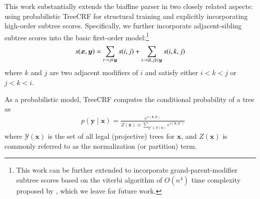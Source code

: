 
This work substantially extends the biaffine parser in two closely related aspects:
using probabilistic TreeCRF for structural training and explicitly incorporating high-order subtree scores.
Specifically, we further incorporate adjacent-sibling subtree scores into the basic first-order model:\footnote{
    This work can be further extended to incorporate
    grand-parent-modifier subtree scores
    based on the viterbi algorithm of $O(n^4)$ time complexity proposed by \citet{koo-collins-2010-efficient}, which
    we leave for future work.
}
\begin{equation}\label{eq:score-definition-2o}
    s(\boldsymbol{x}, \boldsymbol{y}) = \sum_{i\rightarrow j \in \boldsymbol{y}}s(i,j) + \sum_{
        i\rightarrow \{k,j\} \in \boldsymbol{y} %
    } s(i,k,j)
\end{equation}
where $k$ and $j$ are two adjacent modifiers of $i$ and satisfy either $i < k < j$ or $j < k < i$.

As a probabilistic model, TreeCRF computes the conditional probability of a tree as
\begin{equation}\label{equation:prob-labeled}
    \begin{split}
        & p(\boldsymbol{y}\mid\boldsymbol{x})  = \frac{e^{s(\boldsymbol{x},\boldsymbol{y})}}{Z(\boldsymbol{x}) \equiv \sum_{\boldsymbol{y'} \in \mathcal{Y}(\boldsymbol{x})} {e^{s(\boldsymbol{x},\boldsymbol{y'})}}}
    \end{split}
\end{equation}
where $\mathcal{Y}(\boldsymbol{x})$ is the set of all legal (projective) trees for $\boldsymbol{x}$, and
$Z(\boldsymbol{x})$ is commonly referred to as the normalization (or partition) term.

